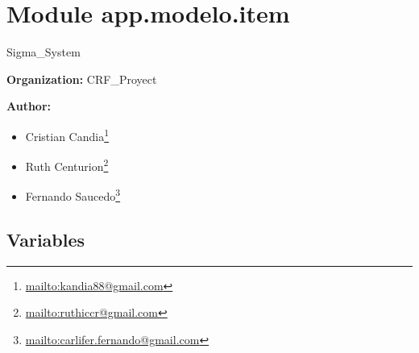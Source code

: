 %
%
%


\section{Module app.modelo.item}

    \label{app:modelo:item}
Sigma\_System

\textbf{Organization:} CRF\_Proyect



\textbf{Author:} \begin{itemize}
\setlength{\parskip}{0.6ex}
  \item Cristian 
    Candia\footnote{\href{mailto:kandia88@gmail.com}{mailto:kandia88@gmail.com}}

  \item Ruth 
    Centurion\footnote{\href{mailto:ruthiccr@gmail.com}{mailto:ruthiccr@gmail.com}}

  \item Fernando 
    Saucedo\footnote{\href{mailto:carlifer.fernando@gmail.com}{mailto:carlifer.fernando@gmail.com}}

\end{itemize}





  \subsection{Variables}

